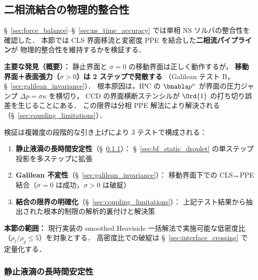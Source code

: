 %
\subsection{二相流結合の物理的整合性}
\label{sec:advection_pressure_coupling}

§~\ref{sec:force_balance}--§~\ref{sec:ns_time_accuracy} では単相 NS ソルバの整合性を確認した．
本節では CLS 界面移流と変密度 PPE を結合した\textbf{二相流パイプライン}が
物理的整合性を維持するかを検証する．

\noindent\textbf{主要な発見（概要）：}
静止界面と $\sigma = 0$ の移動界面は正しく動作するが，
\textbf{移動界面＋表面張力（$\sigma > 0$）は 2 ステップで発散する}
（Galilean テスト B，§~\ref{sec:galilean_invariance}）．
根本原因は，IPC の $\bnabla p^n$ が界面の圧力ジャンプ $\Delta p = \sigma\kappa$ を横切り，
CCD の界面横断ステンシルが $\Ord{1}$ の打ち切り誤差を生じることにある．
この限界は分相 PPE 解法により解決される（§~\ref{sec:coupling_limitations}）．

検証は複雑度の段階的な引き上げにより 3 テストで構成される：
\begin{enumerate}[noitemsep]
  \item \textbf{静止液滴の長時間安定性}（§~\ref{sec:twophase_static_longterm}）：
        §~\ref{sec:bf_static_droplet} の単ステップ投影を多ステップに拡張
  \item \textbf{Galilean 不変性}（§~\ref{sec:galilean_invariance}）：
        移動界面下での CLS↔PPE 結合（$\sigma = 0$ は成功，$\sigma > 0$ は破綻）
  \item \textbf{結合の限界の明確化}（§~\ref{sec:coupling_limitations}）：
        上記テスト結果から抽出された根本的制限の解析的裏付けと解決策
\end{enumerate}

\noindent\textbf{本節の範囲：}
現行実装の smoothed Heaviside 一括解法で実施可能な低密度比
（$\rho_l/\rho_g \leq 5$）を対象とする．
高密度比での破綻は §~\ref{sec:interface_crossing} で定量化する．

\subsubsection{静止液滴の長時間安定性}
\label{sec:twophase_static_longterm}

